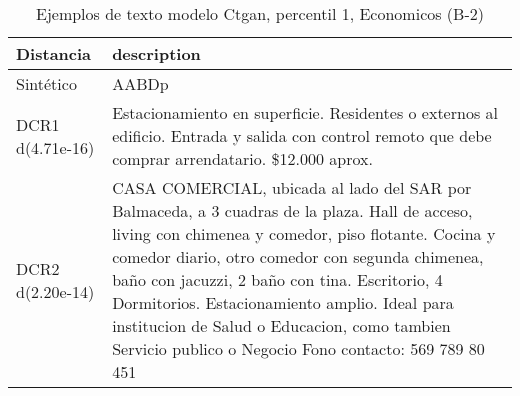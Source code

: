 \begin{table}[H]
\centering
\fontsize{10}{14}\selectfont
\caption{Ejemplos de texto modelo Ctgan, percentil 1, Economicos (B-2)}
\label{table-example-economicos-b-2-ctgan-1p-text}
\begin{tabular}{|l|m{35em}|}
\hline
\rowcolor[gray]{0.8}
Distancia & description \\
\hline Sintético & AABDp \\
\hline DCR1 d(4.71e-16) & Estacionamiento en superficie. Residentes o externos al edificio. Entrada y salida con control remoto que debe comprar arrendatario. \$12.000 aprox. \\
\hline DCR2 d(2.20e-14) &  CASA COMERCIAL, ubicada  al lado del SAR por Balmaceda, a 3 cuadras de la plaza. Hall de acceso, living con chimenea y comedor, piso flotante. Cocina y comedor diario, otro comedor con segunda chimenea, ba\~no con jacuzzi, 2 ba\~no con tina. Escritorio, 4 Dormitorios. Estacionamiento amplio. 
Ideal para institucion de Salud o Educacion, como tambien Servicio publico o Negocio 
Fono contacto: 569 789 80 451 \\
\hline
\end{tabular}
\end{table}
